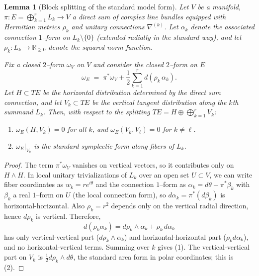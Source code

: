 \documentclass[11pt]{article}
\newtheorem{lemma}[theorem]{Lemma}
\theoremstyle{definition}
\begin{document}
\begin{lemma}[Block splitting of the standard model form]\label{lem:block}
Let $V$ be a manifold, $\pi\colon E=\bigoplus_{k=1}^r L_k\to V$ a direct sum of complex line bundles equipped with
Hermitian metrics $\rho_k$ and unitary connections $\nabla^{(k)}$.
Let $\alpha_k$ denote the associated connection $1$--form on $L_k\setminus\{0\}$ (extended radially in the standard way),
and let $\rho_k\colon L_k\to\mathbb R_{\ge 0}$ denote the squared norm function.

Fix a closed $2$--form $\omega_V$ on $V$ and consider the closed $2$--form on $E$
\begin{equation}\label{eq:modelomega}
\omega_E \;=\; \pi^\ast\omega_V + \frac12\sum_{k=1}^r d(\rho_k\,\alpha_k).
\end{equation}
Let $H\subset TE$ be the horizontal distribution determined by the direct sum connection, and let
$V_k\subset TE$ be the vertical tangent distribution along the $k$th summand $L_k$.
Then, with respect to the splitting $TE = H \oplus \bigoplus_{k=1}^r V_k$:
\begin{enumerate}
\item $\omega_E(H,V_k)=0$ for all $k$, and $\omega_E(V_k,V_\ell)=0$ for $k\neq \ell$.
\item $\omega_E|_{V_k}$ is the standard symplectic form along fibers of $L_k$.
\end{enumerate}
\end{lemma}

\begin{proof}
The term $\pi^\ast\omega_V$ vanishes on vertical vectors, so it contributes only on $H\wedge H$.
In local unitary trivializations of $L_k$ over an open set $U\subset V$, we can write fiber coordinates
as $w_k = re^{i\theta}$ and the connection $1$--form as $\alpha_k = d\theta + \pi^\ast\beta_k$
with $\beta_k$ a real $1$--form on $U$ (the local connection form), so $d\alpha_k = \pi^\ast(d\beta_k)$
is horizontal-horizontal. Also $\rho_k=r^2$ depends only on the vertical radial direction, hence $d\rho_k$
is vertical. Therefore,
\[
d(\rho_k\alpha_k)= d\rho_k\wedge \alpha_k + \rho_k\, d\alpha_k
\]
has only vertical-vertical part ($d\rho_k\wedge \alpha_k$) and horizontal-horizontal part ($\rho_k d\alpha_k$),
and no horizontal-vertical terms. Summing over $k$ gives (1). The vertical-vertical part on $V_k$ is
$\frac12 d\rho_k\wedge d\theta$, the standard area form in polar coordinates; this is (2).
\end{proof}
\end{document}
